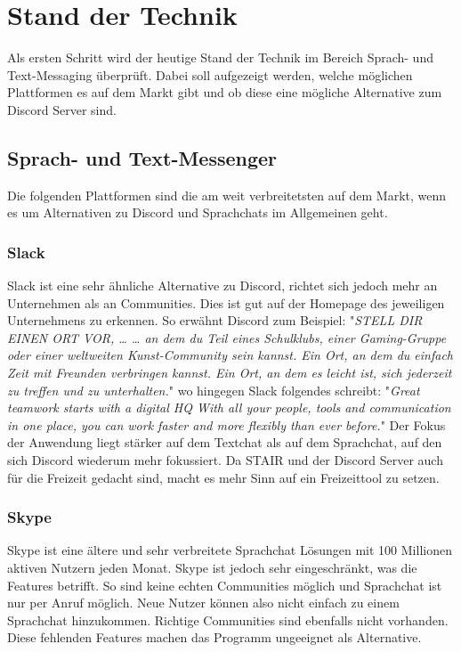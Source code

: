 \documentclass[a4paper, table]{article}
\begin{document}
\newpage
\section{Stand der Technik}\label{state-of-the-art}
Als ersten Schritt wird der heutige Stand der Technik im Bereich Sprach- und Text-Messaging überprüft. 
Dabei soll aufgezeigt werden, welche möglichen Plattformen es auf dem Markt gibt und ob diese eine mögliche Alternative zum Discord Server sind.

\subsection{Sprach- und Text-Messenger}
Die folgenden Plattformen sind die am weit verbreitetsten auf dem Markt, wenn es um Alternativen zu Discord und Sprachchats im Allgemeinen geht. \autocite{noauthor_discord-alternativen_nodate}

\subsubsection*{Slack}
Slack ist eine sehr ähnliche Alternative zu Discord, richtet sich jedoch mehr an Unternehmen als an Communities. 
Dies ist gut auf der Homepage des jeweiligen Unternehmens zu erkennen. 
So erwähnt Discord zum Beispiel: "\textit{STELL DIR EINEN ORT VOR, …
… an dem du Teil eines Schulklubs, einer Gaming-Gruppe oder einer weltweiten Kunst-Community sein kannst. Ein Ort, an dem du einfach Zeit mit Freunden verbringen kannst. Ein Ort, an dem es leicht ist, sich jederzeit zu treffen und zu unterhalten.}" \autocite{noauthor_discord_nodate}
wo hingegen Slack folgendes schreibt: "\textit{Great teamwork starts with a digital HQ
With all your people, tools and communication in one place, you can work faster and more flexibly than ever before.}"\autocite{slack_slack_nodate}
Der Fokus der Anwendung liegt stärker auf dem Textchat als auf dem Sprachchat, auf den sich Discord wiederum mehr fokussiert.\autocite{noauthor_slack_nodate}
Da STAIR und der Discord Server auch für die Freizeit gedacht sind, macht es mehr Sinn auf ein Freizeittool zu setzen.

\subsubsection*{Skype}
Skype ist eine ältere und sehr verbreitete Sprachchat Lösungen mit 100 Millionen aktiven Nutzern jeden Monat. \autocite{lardinois_microsoft_2020}
Skype ist jedoch sehr eingeschränkt, was die Features betrifft. 
So sind keine echten Communities möglich und Sprachchat ist nur per Anruf möglich. 
Neue Nutzer können also nicht einfach zu einem Sprachchat hinzukommen. 
Richtige Communities sind ebenfalls nicht vorhanden. \autocite{mattise_discord_2022}
Diese fehlenden Features machen das Programm ungeeignet als Alternative.
\end{document}
